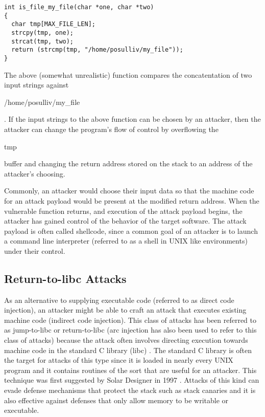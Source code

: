 \begin{mylisting}
\begin{verbatim}
int is_file_my_file(char *one, char *two)
{
  char tmp[MAX_FILE_LEN];
  strcpy(tmp, one);
  strcat(tmp, two);
  return (strcmp(tmp, "/home/posulliv/my_file"));
}
\end{verbatim}
\end{mylisting}

The above (somewhat unrealistic) function compares the concatentation of two input strings against
\begin{em}/home/posulliv/my\_file\end{em}. If the input strings to the above function can be chosen by an
attacker, then the attacker can change the program's flow of control by overflowing the
\begin{em}tmp\end{em} buffer and changing the return address stored on the stack to an address of
the attacker's choosing.

Commonly, an attacker would choose their input data so that the machine code for an attack payload
would be present at the modified return address. When the vulnerable function returns, and execution
of the attack payload begins, the attacker has gained control of the behavior of the target
software. The attack payload is often called shellcode, since a common goal of an attacker is to
launch a command line interpreter (referred to as a shell in UNIX like environments) under their
control.

\subsection{Return-to-libc Attacks}

As an alternative to supplying executable code (referred to as direct code injection), an attacker
might be able to craft an attack that executes existing machine code (indirect code injection). This
class of attacks has been referred to as jump-to-libc or return-to-libc (arc injection \cite{} has
also been used to refer to this class of attacks) because the attack often involves directing
execution towards machine code in the standard C library (libc) \cite{}. The standard C library is
often the target for attacks of this type since it is loaded in nearly every UNIX program and it
contains routines of the sort that are useful for an attacker. This technique was first suggested by
Solar Designer in 1997 \cite{}. Attacks of this kind can evade defense mechanisms that protect the
stack such as stack canaries and it is also effective against defenses that only allow memory to be
writable or executable.

